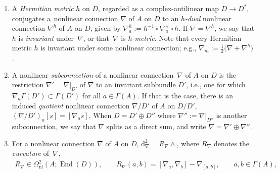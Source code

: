 \documentclass[11pt]{article}
\numberwithin{equation}{section}
\newcommand{\la}{\langle}
\newcommand{\ra}{\rangle}
\newcommand{\dd}{\mathrm{d}}
\newcommand{\8}{\infty}
\begin{document}
\begin{enumerate}
\begin{itemize}
\begin{gather*}
 \!\sum_{i=0}^p\! (-1)^i\nabla_{a_i}\eta(a_0,\dots ,\widehat{a_i},\dots ,a_p) + \!\sum_{i<j}\! (-1)^{i+j}\eta([a_i,a_j],a_0,\dots ,\widehat{a_i},\dots ,\widehat{a_j},\dots ,a_p);\!
\end{gather*}
\item a \emph{dual} nonlinear connection $\nabla^{\vee}$ of $A$ on $D^*$, defined by the condition that
\begin{gather*}
 \mathscr{L}_a\la \theta,s\ra = \la \nabla^{\vee}_a\theta,s\ra + \la \theta,\nabla_as\ra, \qquad a \in \Gamma(A), \qquad s \in \Gamma(D), \quad \theta \in \Gamma(D^*),
\end{gather*}
\item a nonlinear connection of $A$ on $\operatorname{End}(D)$, given by $\nabla_aT=[\nabla_a,T]$, whose induced derivation $\dd_{\nabla}\colon\Omega_{\mathrm{nl}}(A;\operatorname{End}(D)) \to \Omega_{\mathrm{nl}}(A;\operatorname{End}(D))$ is given by the graded commuta\-tor~$[\nabla,\cdot]$.
\end{itemize}
\item A \emph{Hermitian metric} $h$ on $D$, regarded as a complex-antilinear map $D \to D^*$, conjugates a~nonlinear connection $\nabla$ of $A$ on $D$ to an \emph{$h$-dual} nonlinear connection $\nabla^h$ of $A$ on $D$, given by $\nabla^h_a:= h^{-1} \circ \nabla^{\vee}_a \circ h$. If $\nabla=\nabla^h$, we say that $h$ is \emph{invariant} under~$\nabla$, or that~$\nabla$ is \emph{$h$-metric}. Note that every Hermitian metric $h$ is invariant under some nonlinear connection; e.g., $\nabla_m:= \frac{1}{2}\big(\nabla+\nabla^h\big)$.
\item A nonlinear \emph{subconnection} of a nonlinear connection~$\nabla$ of $A$ on $D$ is the restriction $\nabla'=\nabla|_{D'}$ of $\nabla$ to an invariant subbundle $D'$, i.e., one for which $\nabla_a \Gamma(D') \subset \Gamma(D')$ for all $a \in \Gamma(A)$. If that is the case, there is an induced \emph{quotient} nonlinear connection $\nabla/D'$ of $A$ on $D/D'$, $(\nabla/D')_a [s] = [\nabla_as]$. When $D = D' \oplus D''$ where $\nabla'':=\nabla|_{D''}$ is another subconnection, we say that $\nabla$ splits as a direct sum, and write $\nabla = \nabla' \oplus \nabla''$.
\item For a nonlinear connection $\nabla$ of $A$ on $D$, $\dd_{\nabla}^2=R_{\nabla} \wedge $, where $R_{\nabla}$ denotes the \emph{curvature} of~$\nabla$,
\begin{gather*}
 R_{\nabla} \in \Omega^2_{\mathrm{nl}}(A;\operatorname{End}(D)), \qquad R_{\nabla}(a,b) = [\nabla_a,\nabla_b]-\nabla_{[a,b]}, \qquad a,b \in \Gamma(A),

\end{gather*}
\end{enumerate}
\end{document}
